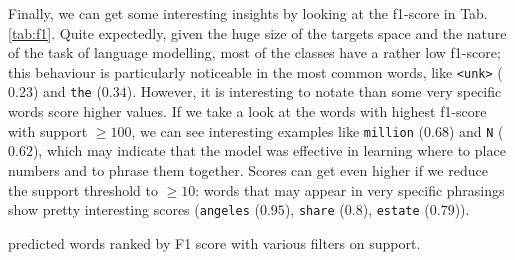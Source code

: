 Finally, we can get some interesting insights by looking at the f1-score in Tab.\ref{tab:f1}. Quite expectedly, given the huge size of the targets space and the nature of the task of language modelling, most of the classes have a rather low f1-score; this behaviour is particularly noticeable in the most common words, like \texttt{<unk>} ($0.23$) and \texttt{the} ($0.34$). However, it is interesting to notate than some very specific words score higher values. If we take a look at the words with highest f1-score with support $\ge 100$, we can see interesting examples like \texttt{million} ($0.68$) and \texttt{N} ($0.62$), which may indicate that the model was effective in learning where to place numbers and to phrase them together. Scores can get even higher if we reduce the support threshold to $\ge 10$: words that may appear in very specific phrasings show pretty interesting scores (\texttt{angeles} ($0.95$), \texttt{share} ($0.8$), \texttt{estate} ($0.79$)).

\begin{table}[hbt]
    \centering
    
    \caption{predicted words ranked by F1 score with various filters on support.}
    \label{tab:f1}
\end{table}
